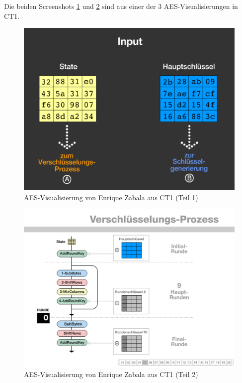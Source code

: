 \begin{refsegment}
\clearpage
\noindent Die beiden Screenshots \ref{AES-Visualization-Zabala-Flash-step3} und
\ref{AES-Visualization-Zabala-Flash-step5} sind aus einer der 3
AES-Visualisierungen in CT1.

\begin{figure}[!ht]
\begin{center}
\includegraphics[scale=0.6]{figures/AES-Visualization-Zabala-Flash-step3_de}
\caption{AES-Visualisierung von Enrique Zabala aus CT1 (Teil 1)}
\label{AES-Visualization-Zabala-Flash-step3}
\end{center}
\end{figure}

\begin{figure}[!ht]
\begin{center}
\includegraphics[scale=0.6]{figures/AES-Visualization-Zabala-Flash-step5_de}
\caption{AES-Visualisierung von Enrique Zabala aus CT1 (Teil 2)}
\label{AES-Visualization-Zabala-Flash-step5}
\end{center}
\end{figure}



\end{refsegment}
